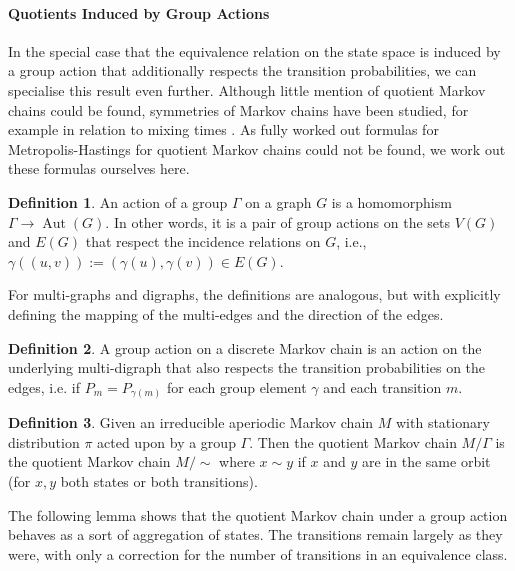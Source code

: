 \documentclass{article}
\theoremstyle{definition}
\newtheorem{definition}{Definition}
\DeclareMathOperator{\Aut}{Aut}
\begin{document}
\paragraph{Quotients Induced by Group Actions}
In the special case that the equivalence relation on the state space is induced by a group action that additionally respects the transition probabilities, we can specialise this result even further. Although little mention of quotient Markov chains could be found, symmetries of Markov chains have been studied, for example in relation to mixing times \cite[e.g.][]{doi:10.1137/070689413, doi:10.1080/15427951.2005.10129100}. As fully worked out formulas for Metropolis-Hastings for quotient Markov chains could not be found, we work out these formulas ourselves here.

\begin{definition}
    An action of a group $\Gamma$ on a graph $G$ is a homomorphism $\Gamma \to \Aut(G)$. In other words, it is a
    pair of group actions on the sets $V(G)$ and $E(G)$ that respect the incidence relations on $G$, i.e., $\gamma((u,v)) := (\gamma(u), \gamma(v)) \in E(G)$. 
\end{definition}
For multi-graphs and digraphs, the definitions are analogous, but with explicitly defining the mapping of the multi-edges and the direction of the edges. 

\begin{definition}
    A group action on a discrete Markov chain is an action on the underlying multi-digraph that also respects the transition probabilities on the edges, i.e. if $P_{m} = P_{\gamma(m)}$ for each group element $\gamma$ and each transition $m$.
\end{definition}

\begin{definition}
    Given an irreducible aperiodic Markov chain $M$ with stationary distribution $\pi$ acted upon by a group $\Gamma$. Then the quotient Markov chain $M/\Gamma$ is the quotient Markov chain $M/\sim$ where $x \sim y$ if $x$ and $y$ are in the same orbit (for $x,y$ both states or both transitions).
\end{definition}

The following lemma shows that the quotient Markov chain under a group action behaves as a sort of aggregation of states. The transitions remain largely as they were, with only a correction for the number of transitions in an equivalence class.
\end{document}
